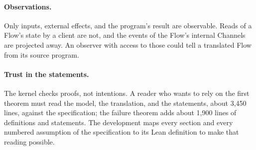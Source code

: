\paragraph{Observations.}
Only inputs, external effects, and the program's result are observable.
Reads of a Flow's state by a client are not, and the events of the Flow's
internal Channels are projected away. An observer with access to those
could tell a translated Flow from its source program.

\paragraph{Trust in the statements.}
The kernel checks proofs, not intentions. A reader who wants to rely on the
first theorem must read the model, the translation, and the statements,
about 3,450 lines, against the specification; the failure theorem adds
about 1,900 lines of definitions and statements. The development maps every section
and every numbered assumption of the specification to its Lean definition
to make that reading possible.
